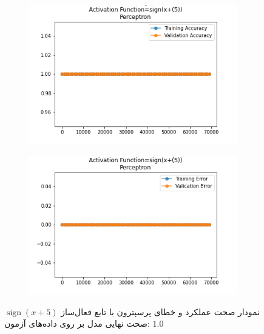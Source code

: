 \documentclass[12pt, a4paper]{article}
\DeclareMathOperator{\sign}{sign}
\begin{document}
\begin{figure}[h]
    \begin{subfigure}{0.45\linewidth}
        \centering
        \includegraphics[width=\linewidth]{images/3/perceptron/activation_func/3.png}
    \end{subfigure}
    \hfil
    \begin{subfigure}{0.45\linewidth}
        \centering
        \includegraphics[width=\linewidth]{images/3/perceptron/activation_func/4.png}
    \end{subfigure}
    \caption{نمودار صحت عملکرد‌ و خطای پرسپترون با تابع فعال‌ساز $\sign(x+5)$
    \newline
    صحت نهایی مدل بر روی داده‌های آزمون: $1.0$}
\end{figure}

\clearpage
\end{document}
